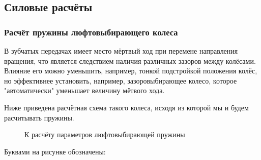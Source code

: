 \documentclass[14pt,a4paper,russian]{scrartcl}
\begin{document}
        
        

    
\subsection{Силовые расчёты}
    \subsubsection{Расчёт пружины люфтовыбирающего колеса}
        В зубчатых передачах имеет место мёртвый ход при перемене направления вращения,
        что является следствием наличия различных зазоров между колёсами. Влияние его можно уменьшить,
        например, тонкой подстройкой положения колёс, но эффективнее установить, например, зазоровыбирающее
        колесо, которое "автоматически" уменьшает величину мётвого хода.\par
        Ниже приведена расчётная схема такого колеса, исходя из которой мы и будем расчитывать пружины.\par
        \begin{figure}[h]
            \caption{К расчёту параметров люфтовыбирающей пружины}
        \end{figure}
        Буквами на рисунке обозначены:
\end{document}
